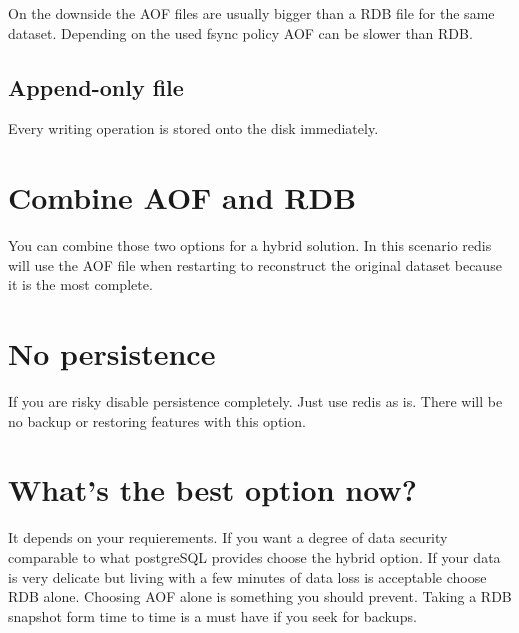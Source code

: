 On the downside the AOF files are usually bigger than a RDB file for the same dataset. Depending on the used fsync policy AOF can be slower than RDB.

\subsection{Append-only file}
Every writing operation is stored onto the disk immediately.

\section{Combine AOF and RDB}
You can combine those two options for a hybrid solution. In this scenario redis will use the AOF file when restarting to reconstruct the original dataset because it is the most complete.

\section{No persistence}
If you are risky disable persistence completely. Just use redis as is. There will be no backup or restoring features with this option.

\section{What's the best option now?}
It depends on your requierements. If you want a degree of data security comparable to what postgreSQL provides choose the hybrid option.
If your data is very delicate but living with a few minutes of data loss is acceptable choose RDB alone.
Choosing AOF alone is something you should prevent. Taking a RDB snapshot form time to time is a must have if you seek for backups.